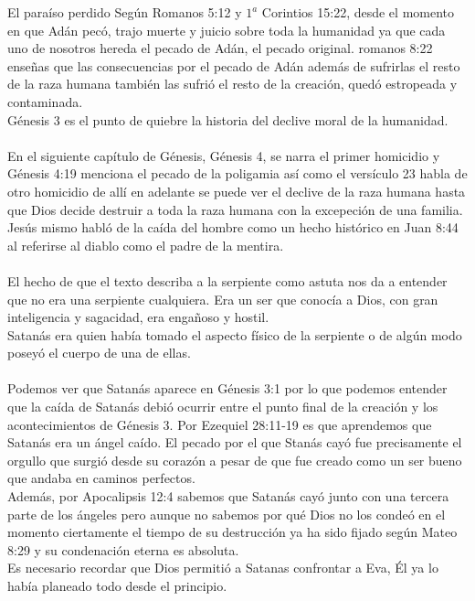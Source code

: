 \begin{section}{El paraíso perdido}
	Según Romanos 5:12 y $1^{a}$ Corintios 15:22, desde el momento en que Adán pecó, trajo muerte y juicio sobre toda la humanidad ya que cada uno de nosotros hereda el pecado de Adán, el pecado original. romanos 8:22 enseñas que las consecuencias por el pecado de Adán además de sufrirlas el resto de la raza humana también las sufrió el resto de la creación, quedó estropeada y contaminada.\\
	Génesis 3 es el punto de quiebre la historia del declive moral de la humanidad.\\
	\\
	En el siguiente capítulo de Génesis, Génesis 4, se narra el primer homicidio y Génesis 4:19 menciona el pecado de la poligamia así como el versículo 23 habla de otro homicidio de allí en adelante se puede ver el declive de la raza humana hasta que Dios decide destruir a toda la raza humana con la excepeción de una familia.\\
	Jesús mismo habló de la caída del hombre como un hecho histórico en Juan 8:44 al referirse al diablo como el padre de la mentira.\\
	\\
	El hecho de que el texto describa a la serpiente como astuta nos da a entender que no era una serpiente cualquiera. Era un ser que conocía a Dios, con gran inteligencia y sagacidad, era engañoso y hostil.\\
	Satanás era quien había tomado el aspecto físico de la serpiente o de algún modo poseyó el cuerpo de una de ellas.\\
	\\
	Podemos ver que Satanás aparece en Génesis 3:1 por lo que podemos entender que la caída de Satanás debió ocurrir entre el punto final de la creación y los acontecimientos de Génesis 3. Por Ezequiel 28:11-19 es que aprendemos que Satanás era un ángel caído. El pecado por el que Stanás cayó fue precisamente el orgullo que surgió desde su corazón a pesar de que fue creado como un ser bueno que andaba en caminos perfectos.\\
	Además, por Apocalipsis 12:4 sabemos que Satanás cayó junto con una tercera parte de los ángeles pero aunque no sabemos por qué Dios no los condeó en el momento ciertamente el tiempo de su destrucción ya ha sido fijado según Mateo 8:29 y su condenación eterna es absoluta.\\
	Es necesario recordar que Dios permitió a Satanas confrontar a Eva, Él ya lo había planeado todo desde el principio.\\

\end{section}
